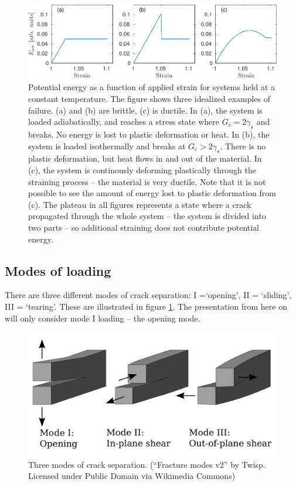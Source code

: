 \begin{figure}
\centering
\includegraphics[width=\textwidth]{../figures/thesis/idealized_fracture_e_pot.pdf}
\caption{Potential energy as a function of applied strain for systems held at a constant temperature. The figure shows three idealized examples of failure. (a) and (b) are brittle, (c) is ductile. In (a), the system is loaded adiabatically, and reaches a stress state where $G_c = 2\gamma_s$ and breaks. No energy is lost to plastic deformation or heat. In (b), the system is loaded isothermally and breaks at $G_c > 2\gamma_s$. There is no plastic deformation, but heat flows in and out of the material. In (c), the system is continously deforming plastically through the straining process -- the material is very ductile. Note that it is not possible to see the amount of energy lost to plastic deformation from (c). The plateau in all figures represents a state where a crack propagated through the whole system -- the system is divided into two parts -- so additional straining does not contribute potential energy. }
\end{figure}

\subsection{Modes of loading}
There are three different modes of crack separation: I =`opening', II = `sliding', III = `tearing'. These are illustrated in figure \ref{fig:loading_modes}. The presentation from here on will only consider mode I loading -- the opening mode.

\begin{figure}
\includegraphics[width=\textwidth]{../figures/thesis/Fracture_modes_v2.pdf}
\caption{Three modes of crack separation. (``Fracture modes v2'' by Twisp. Licensed under Public Domain via Wikimedia Commons)}
\label{fig:loading_modes}
\end{figure}

